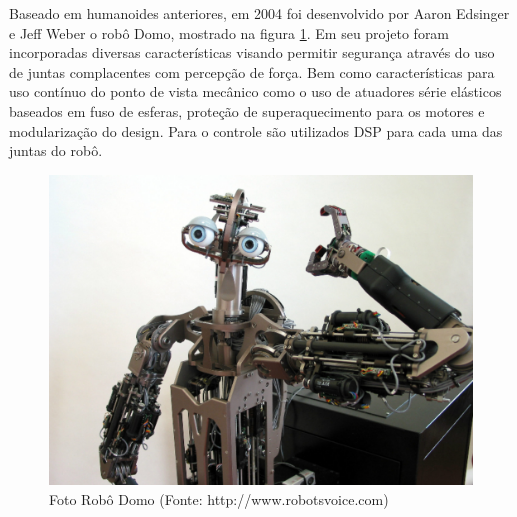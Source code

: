 




Baseado em humanoides anteriores, em 2004 foi desenvolvido por Aaron Edsinger e Jeff Weber o robô Domo, mostrado na figura \ref{fig:domorobot}. Em seu projeto foram incorporadas diversas características visando permitir segurança através do uso de juntas complacentes com percepção de força. Bem como características para uso contínuo do ponto de vista mecânico como o uso de atuadores série elásticos baseados em fuso de esferas, proteção de superaquecimento para os motores e modularização do design. Para o controle são utilizados DSP para cada uma das juntas do robô\cite{edsinger2004domo}.

\begin{figure}[H]
    \centering
    \includegraphics[width=0.6\linewidth]{tex/figs/domo-foto.jpg}
    \caption{Foto Robô Domo (Fonte: http://www.robotsvoice.com)}
    \label{fig:domorobot}
\end{figure}

